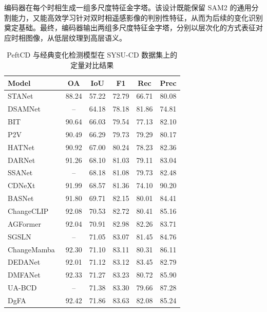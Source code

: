 编码器在每个时相生成一组多尺度特征金字塔。该设计既能保留 SAM2 的通用分割能力，又能高效学习针对双时相遥感影像的判别性特征，从而为后续的变化识别奠定基础。最终，编码器输出两组多尺度特征金字塔，分别以层次化的方式表征对应时相图像，从低层纹理到高层语义。  


\begin{table}[!htbp]
\centering
\caption{PeftCD 与经典变化检测模型在 SYSU-CD 数据集上的定量对比结果}
\label{tab:peftcd_sysu}
\begin{tabular}{l c c c c c}
\toprule
\textbf{Model} & \textbf{OA} & \textbf{IoU} & \textbf{F1} & \textbf{Rec} & \textbf{Prec} \\
\midrule
STANet~\cite{chen_spatial-temporal_2020} & 88.24 & 57.22 & 72.79 & 66.71 & 80.08 \\
DSAMNet~\cite{shi_deeply_2022} & -- & 64.18 & 78.18 & 81.86 & 74.81 \\
BIT~\cite{chen_remote_2022} & 90.64 & 66.03 & 79.54 & 77.13 & 82.10 \\
P2V~\cite{lin_transition_2023} & 90.49 & 66.29 & 79.73 & 79.29 & 80.17 \\
HATNet~\cite{Xu2024HybridAT} & 90.92 & 67.00 & 80.24 & 78.23 & 82.36 \\
DARNet~\cite{li_densely_2022} & 91.26 & 68.10 & 81.03 & 79.11 & 83.04 \\
SSANet~\cite{Jiang2022JointVL} & -- & 68.18 & 81.08 & 79.73 & 82.48 \\
CDNeXt~\cite{wei_robust_2024} & 91.99 & 68.57 & 81.36 & 74.10 & 90.20 \\
BASNet~\cite{z_wang_bitemporal_2024} & 91.80 & 69.71 & 82.15 & 80.01 & 84.41 \\
ChangeCLIP~\cite{dong2024changeclip} & 92.08 & 70.53 & 82.72 & 80.41 & 85.16 \\
AGFormer~\cite{Chen2025AGFormerAA} & 92.04 & 70.91 & 82.98 & 82.26 & 83.71 \\
SGSLN~\cite{zhao_exchanging_2023} & -- & 71.05 & 83.07 & 81.45 & 84.76 \\
ChangeMamba~\cite{chen2024changemamba} & 92.30 & 71.10 & 83.11 & 80.31 & 86.11 \\
DEDANet~\cite{Li2025DifferenceEA} & 92.01 & 71.12 & 83.12 & 83.45 & 82.79 \\
DMFANet~\cite{Zhan2025DifferenceAwareMF} & 92.33 & 71.27 & 83.23 & 80.72 & 85.90 \\
UA-BCD~\cite{li_overcoming_2025} & -- & 71.38 & 83.30 & 79.66 & 87.28 \\
DgFA~\cite{f_zhou_dual-granularity_2025}   & 92.42 & 71.86 & 83.63 & 82.08 & 85.24 \\

\end{tabular}
\end{table}
